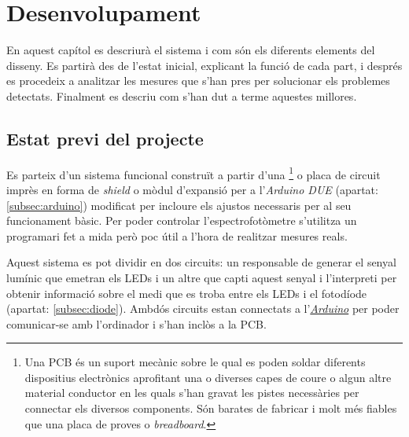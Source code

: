 \chapter{Desenvolupament}\label{ch:desenvolupament}

En aquest capítol es descriurà el sistema i com són els diferents elements del disseny. Es partirà des de l'estat inicial, explicant la funció de cada part, i després es procedeix a analitzar les mesures que s'han pres per solucionar els problemes detectats. Finalment es descriu com s'han dut a terme aquestes millores.

\section{Estat previ del projecte}\label{sec:punt_de_partida}

Es parteix d'un sistema funcional construït a partir d'una \footnote{Una \ac{PCB} és un suport mecànic sobre le qual es poden soldar diferents dispositius electrònics aprofitant una o diverses capes de coure o algun altre material conductor en les quals s'han gravat les pistes necessàries per connectar els diversos components. Són barates de fabricar i molt més fiables que una placa de proves o \textit{breadboard}.} o placa de circuit imprès\cite{sirio:2015} en forma de \textit{shield} o mòdul d'expansió per a l'\textit{Arduino DUE} (apartat: \ref{subsec:arduino}) modificat per incloure els ajustos necessaris per al seu funcionament bàsic\cite{carles:2017}. Per poder controlar l'espectrofotòmetre s'utilitza un programari fet a mida però poc útil a l'hora de realitzar mesures reals.

Aquest sistema es pot dividir en dos circuits: un responsable de generar el senyal lumínic que emetran els \acp{LED} i un altre que capti aquest senyal i l'interpreti per obtenir informació sobre el medi que es troba entre els \acp{LED} i el fotodíode (apartat: \ref{subsec:diode}). Ambdós circuits estan connectats a l'\hyperref[subsec:arduino]{\textit{Arduino}} per poder comunicar-se amb l'ordinador i s'han inclòs a la \ac{PCB}.

